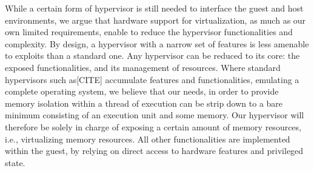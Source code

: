 \documentclass[letterpaper,twocolumn,10pt]{article}
\begin{document}
While a certain form of hypervisor is still needed to interface the guest and host environments, we argue that hardware support for virtualization, as much as our own limited requirements, enable to reduce the hypervisor functionalities and complexity.
By design, a hypervisor with a narrow set of features is less amenable to exploits than a standard one.
Any hypervisor can be reduced to its core: the exposed functionalities, and its management of resources.
Where standard hypervisors such as[CITE] accumulate features and functionalities, emulating a complete operating system, we believe that our needs, in order to provide memory isolation within a thread of execution can be strip down to a bare minimum consisting of an execution unit and some memory.
Our hypervisor will therefore be solely in charge of exposing a certain amount of memory resources, i.e., virtualizing memory resources.
All other functionalities are implemented within the guest, by relying on direct access to hardware features and privileged state. \\





 
\end{document}
